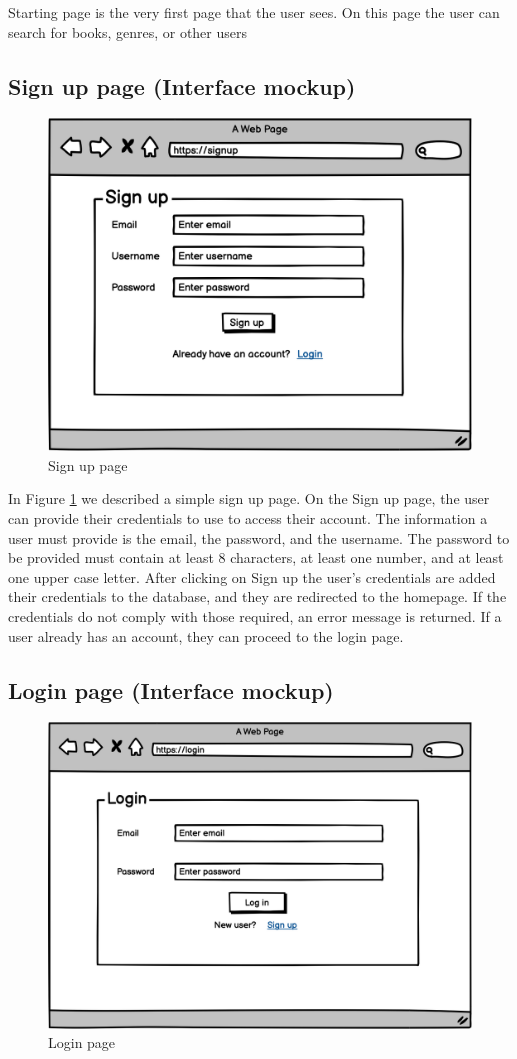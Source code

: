 Starting page is the very first page that the user sees. On this page the user can search for books, genres, or other users

\subsection{Sign up page (Interface mockup)}

\begin{figure}[h]
    \centering
    \includegraphics[width=0.5\linewidth]{sections/PLL/signup.png}
    \caption{Sign up page}
    \label{fig:signup}
\end{figure}

In Figure \ref{fig:signup} we described a simple sign up page. On the Sign up page, the user can provide their credentials to use to access their account. The information a user must provide is the email, the password, and the username. The password to be provided must contain at least 8 characters, at least one number, and at least one upper case letter. After clicking on Sign up the user's credentials are added their credentials to the database, and they are redirected to the homepage. If the credentials do not comply with those required, an error message is returned. If a user already has an account, they can proceed to the login page.

\subsection{Login page (Interface mockup)}

\begin{figure}[h]
    \centering
    \includegraphics[width=0.5\linewidth]{sections/PLL/Login.png}
    \caption{Login page}
    \label{fig:login}
\end{figure}

